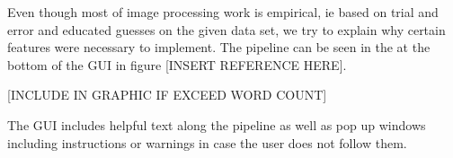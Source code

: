 

Even though most of image processing work is empirical, ie based on trial and error and educated guesses on the given data set, we try to explain why certain features were necessary to implement. %
The pipeline can be seen in the at the bottom of the GUI in figure [INSERT REFERENCE HERE].

[INCLUDE IN GRAPHIC IF EXCEED WORD COUNT]

%

The GUI includes helpful text along the pipeline as well as pop up windows including instructions or warnings in case the user does not follow them. 

